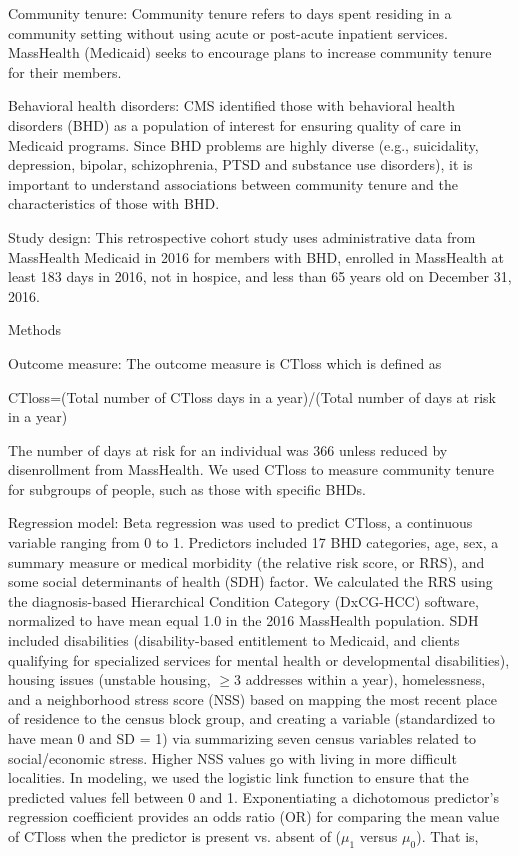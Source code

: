 \begin{itemize}
Community tenure: Community tenure refers to days spent residing in a community setting without using acute or post-acute inpatient services. MassHealth (Medicaid) seeks to encourage plans to increase community tenure for their members.

Behavioral health disorders: CMS identified those with behavioral health disorders (BHD) as a population of interest for ensuring quality of care in Medicaid programs. Since BHD problems are highly diverse (e.g., suicidality, depression, bipolar, schizophrenia, PTSD and substance use disorders), it is important to understand associations between community tenure and the characteristics of those with BHD.

Study design: This retrospective cohort study uses administrative data from MassHealth Medicaid in 2016 for members with BHD, enrolled in MassHealth at least 183 days in 2016, not in hospice, and less than 65 years old on December 31, 2016. 

Methods

Outcome measure: The outcome measure is CTloss which is defined as

CTloss=(Total number of CTloss days in a year)/(Total number of days at risk in a year)

The number of days at risk for an individual was 366 unless reduced by disenrollment from MassHealth. We used CTloss to measure community tenure for subgroups of people, such as those with specific BHDs. 

Regression model: Beta regression was used to predict CTloss, a continuous variable ranging from 0 to 1. Predictors included 17 BHD categories, age, sex, a summary measure or medical morbidity (the relative risk score, or RRS), and some social determinants of health (SDH) factor. We calculated the RRS using the diagnosis-based Hierarchical Condition Category (DxCG-HCC) software, normalized to have mean equal 1.0 in the 2016 MassHealth population. SDH included disabilities (disability-based entitlement to Medicaid, and clients qualifying for specialized services for mental health or developmental disabilities), housing issues (unstable housing, $\ge$3 addresses within a year), homelessness, and a neighborhood stress score (NSS) based on mapping the most recent place of residence to the census block group, and creating a variable (standardized to have mean 0 and SD = 1) via summarizing seven census variables related to social/economic stress. Higher NSS values go with living in more difficult localities. In modeling, we used the logistic link function to ensure that the predicted values fell between 0 and 1. Exponentiating a dichotomous predictor's regression coefficient provides an odds ratio (OR) for comparing the mean value of CTloss when the predictor is present vs. absent of ($\mu_1$ versus $\mu_0$). That is,


\end{itemize}
